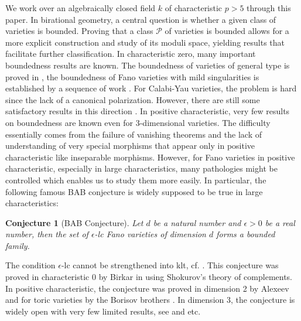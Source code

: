 \documentclass[letterpaper,reqno,12pt]{amsart}
\numberwithin{equation}{section}
\theoremstyle{plain}
\newtheorem{conjecture}[theorem]{Conjecture}
\begin{document}
We work over an algebraically closed field $k$ of characteristic $p>5$ through this paper. In birational geometry, a central question is whether a  given class of varieties is bounded. Proving that a class $\mathcal P$ of varieties is bounded allows for a more explicit construction and study of its moduli space, yielding results that facilitate further classification. In characteristic zero, many important boundedness results are known. The boundedness of varieties of general type is proved in \cite{hacon2012birationalautomorphismsvarietiesgeneral}\cite{HMXboundednessofgeneraltype}, the boundedness of Fano varieties with mild singularities is established by a sequence of work \cite{birkar2019antipluricanonicalsystemsfanovarieties}\cite{birkar2020singularitieslinearsystemsboundedness}\cite{birkarfanofib}. For Calabi-Yau varieties, the problem is hard since the lack of a canonical polarization. However, there are still some satisfactory results in this direction \cite{birkarpolarisedvarieties}\cite{JJZboundedpolarizedLCYfib}. In positive characteristic, very few results on boundedness are known even for 3-dimensional varieties.  The difficulty essentially comes from the failure of vanishing theorems and the lack of understanding of very special morphisms that appear only in positive characteristic like inseparable morphisms. However, for Fano varieties in positive characteristic, especially in large characteristics, many pathologies might be controlled which enables us to study them more easily. In particular, the following famous BAB conjecture is widely supposed to be true in large characteristics:
\begin{conjecture}[BAB Conjecture]
\label{BAB}
    Let $d$ be a natural number and $\epsilon>0$ be a real number, then the set of $\epsilon$-lc Fano varieties of dimension $d$ forms a bounded family.
\end{conjecture}
The condition $\epsilon$-lc cannot be strengthened into klt, cf. \cite[1.2]{birkar2020singularitieslinearsystemsboundedness}. This conjecture was proved in characteristic 0 by Birkar in   \cite{birkar2019antipluricanonicalsystemsfanovarieties}\cite{birkar2020singularitieslinearsystemsboundedness} using Shokurov's theory of complements. In positive characteristic, the conjecture was proved in dimension 2 by Alexeev \cite{boundednessandk2} and for toric varieties by the Borisov brothers \cite{Borisov1993SINGULARTF}. In dimension 3, the conjecture is  widely open with very few limited results, see  \cite{sato2024boundednessweakfanothreefolds}\cite{Das_2019} and etc.
\end{document}
